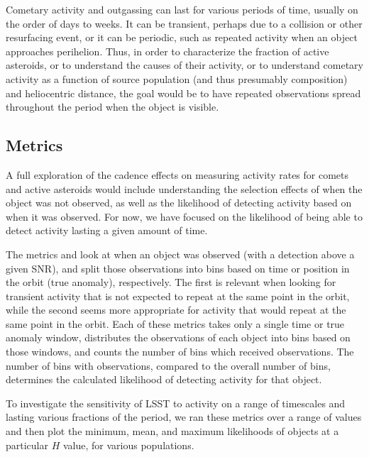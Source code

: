 Cometary activity and outgassing can last for various periods of time,
usually on the order of days to weeks. It can be transient, perhaps
due to a collision or other resurfacing event, or it can be periodic,
such as repeated activity when an object approaches perihelion. Thus,
in order to characterize the fraction of active asteroids, or to
understand the causes of their activity, or to understand cometary
activity as a function of source population (and thus presumably
composition) and heliocentric distance, the goal would be to have
repeated observations spread throughout the period when the object is visible.



\subsection{Metrics}
\label{sec:\secname:metrics}

A full exploration of the cadence effects on measuring activity rates
for comets and active asteroids would include understanding the
selection effects of when the object was not observed, as well as the
likelihood of detecting activity based on when it was observed. For
now, we have focused on the likelihood of being able to detect
activity lasting a given amount of time.

The metrics  and  look at when an object was observed (with
a detection above a given SNR), and
split those observations into bins based on time or position in the
orbit (true anomaly), respectively. The first is relevant when looking
for transient activity that is not expected to repeat at the same
point in the orbit, while the second seems more appropriate for
activity that would repeat at the same point in the orbit. Each of
these metrics takes only a single time or true anomaly window, distributes
the observations of each object into bins based on those windows, and
counts the number of bins which received observations. The number of
bins with observations, compared to the overall number of bins,
determines the calculated likelihood of detecting activity for that
object.

To investigate the sensitivity of LSST to activity on a range of
timescales and lasting various fractions of the period, we ran these
metrics over a range of values and then plot the minimum, mean, and
maximum likelihoods of objects at a particular $H$ value, for various populations.


